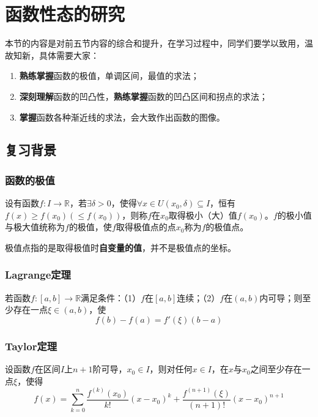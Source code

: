 \chapter{函数性态的研究}\label{ch:6}

本节的内容是对前五节内容的综合和提升，在学习过程中，同学们要学以致用，温故知新，具体需要大家：

\begin{enumerate}
	\item \textbf{熟练掌握}函数的极值，单调区间，最值的求法；
	\item \textbf{深刻理解}函数的凹凸性，\textbf{熟练掌握}函数的凹凸区间和拐点的求法；
	\item \textbf{掌握}函数各种渐近线的求法，会大致作出函数的图像。
\end{enumerate}

\section{复习背景}
\subsection{函数的极值}
\begin{definition}
	设有函数$f:I\to\mathbb{R}$，若$\exists\delta>0$，使得$\forall x\in U(x_0,\delta)\subseteq I$，恒有$f(x)\geq f(x_0)(\leq f(x_0))$，则称$f$在$x_0$取得极小（大）值$f(x_0)$。$f$的极小值与极大值统称为$f$的极值，使$f$取得极值点的点$x_0$称为$f$的极值点。
\end{definition}

\begin{remark}
	极值点指的是取得极值时\textbf{自变量的值}，并不是极值点的坐标。
\end{remark}

\subsection{Lagrange定理}
\begin{theorem}
	若函数$f:[a,b]\to\mathbb{R}$满足条件：（1）$f$在$[a,b]$连续；\quad（2）$f$在$(a,b)$内可导；则至少存在一点$\xi\in (a,b)$，使
	\begin{equation}
		f(b)-f(a)=f'(\xi)(b-a)\label{eq:6.1}
	\end{equation}
\end{theorem}

\subsection{Taylor定理}
\begin{theorem}
	设函数$f$在区间$I$上$n+1$阶可导，$x_0\in I$，则对任何$x\in I$，在$x$与$x_0$之间至少存在一点$\xi$，使得
	\begin{equation}
		f(x)=\sum^n_{k=0}\frac{f^{(k)}(x_0)}{k!}(x-x_0)^k+\frac{f^{(n+1)}(\xi)}{(n+1)!}(x-x_0)^{n+1}\label{eq:6.2}
	\end{equation}
\end{theorem}
